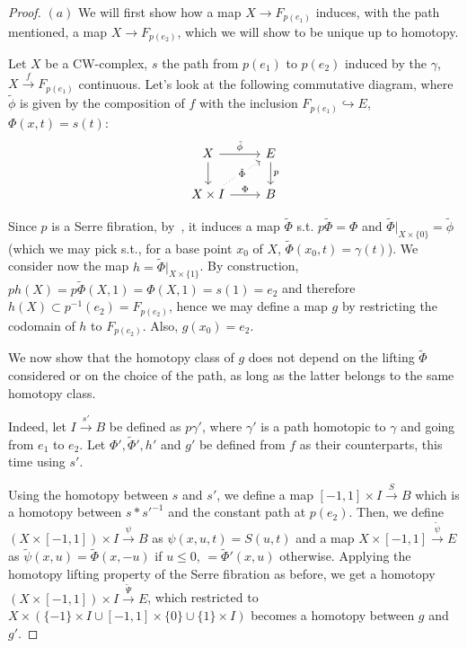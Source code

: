 \documentclass{article}
\begin{document}
\begin{proof}
    $(a)$ We will first show how a map $X\rightarrow F_{p(e_1)}$ induces, with
    the path mentioned, a map $X\rightarrow F_{p(e_2)}$, which we will show to
    be unique up to homotopy.

    Let $X$ be a CW-complex, $s$ the path from $p(e_1)$ to $p(e_2)$ induced
    by the $\gamma$, $X\xrightarrow{f} F_{p(e_1)}$ continuous. Let's look at the
    following commutative diagram, where $\tilde{\phi}$ is given by the
    composition of $f$ with the inclusion $F_{p(e_1)}\hookrightarrow E$, 
    $\Phi(x,t)=s(t)$:
    \[
        \begin{tikzcd}
            X\arrow{r}{\tilde{\phi}}\arrow{d}
            & E\arrow{d}{p} \\
            X\times I\arrow[dotted]{ur}[description]{\tilde{\Phi}}\arrow{r}{\Phi}
            & B
        \end{tikzcd}
    \]

    Since $p$ is a Serre fibration, by~\cite[p. 107, p.110]{FF16}, it induces a
    map $\tilde{\Phi}$ s.t. $p\tilde{\Phi}=\Phi$ and
    $\tilde{\Phi}|_{X\times\{0\}}=\tilde{\phi}$ (which we may pick s.t., for a
    base point $x_0$ of $X$, $\tilde{\Phi}(x_0,t)=\gamma(t)$). We consider now
    the map $h=\tilde{\Phi}|_{X\times\{1\}}$. By construction,
    $ph(X)=p\tilde{\Phi}(X,1)=\Phi(X,1)=s(1)=e_2$ and therefore $h(X)\subset
    p^{-1}(e_2)=F_{p(e_2)}$, hence we may define a map $g$ by restricting the
    codomain of $h$ to $F_{p(e_2)}$. Also, $g(x_0)=e_2$.

    We now show that the homotopy class of $g$ does not depend on the lifting
    $\tilde{\Phi}$ considered or on the choice of the path, as long as the
    latter belongs to the same homotopy class.

    Indeed, let $I\xrightarrow{s'}B$ be defined as $p\gamma'$, where $\gamma'$
    is a path homotopic to $\gamma$ and going from $e_1$ to $e_2$. Let $\Phi',
    \tilde{\Phi}',h'$ and $g'$ be defined from $f$ as their counterparts, this
    time using $s'$.

    Using the homotopy between $s$ and $s'$, we define a map $[-1,1]\times
    I\xrightarrow{S}B$ which is a homotopy between $s*s'^{-1}$ and the constant
    path at $p(e_2)$. Then, we define $(X\times[-1,1])\times I\xrightarrow{\psi}
    B$ as $\psi(x,u,t)=S(u,t)$ and a map
    $X\times[-1,1]\xrightarrow{\tilde{\psi}}E$ as
    $\tilde{\psi}(x,u)=\tilde{\Phi}(x,-u)$ if $u\leq0$, $=\tilde{\Phi}'(x,u)$
    otherwise. Applying the homotopy lifting property of the Serre fibration as
    before, we get a homotopy $(X\times[-1,1])\times
    I\xrightarrow{\tilde{\Psi}}E$, which restricted to $X\times(\{-1\}\times
    I\cup [-1,1]\times\{0\}\cup\{1\}\times I)$ becomes a homotopy between $g$
    and $g'$.


\end{proof}
\end{document}

